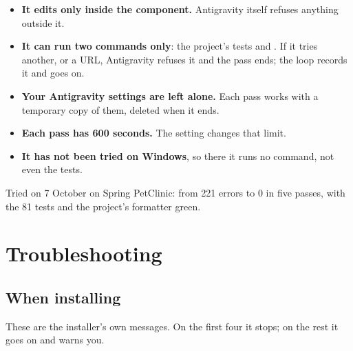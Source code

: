 \documentclass[11pt,a4paper]{article}
\begin{document}
\begin{itemize}
  \item \textbf{It edits only inside the component.} Antigravity itself refuses
        anything outside it.
  \item \textbf{It can run two commands only}: the project's tests and
        . If it tries another, or a URL, Antigravity refuses it and
        the pass ends; the loop records it and goes on.
  \item \textbf{Your Antigravity settings are left alone.} Each pass works with
        a temporary copy of them, deleted when it ends.
  \item \textbf{Each pass has 600 seconds.} The
         setting changes that limit.
  \item \textbf{It has not been tried on Windows}, so there it runs no command,
        not even the tests.
\end{itemize}

\begin{note}
Tried on 7 October on Spring PetClinic: from 221 errors to 0 in five passes,
with the 81 tests and the project's formatter green.
\end{note}

\section{Troubleshooting}
\label{sec:troubleshooting}

\newcommand\problem[2]{\par\addvspace{0.5\baselineskip}\noindent\textbf{\color{pbbrand}#1}\par\nopagebreak\vspace{-0.45\baselineskip}\noindent\hangindent=1.2em\hangafter=0 #2\par}

\subsection{When installing}

These are the installer's own messages. On the first four it stops; on the rest
it goes on and warns you.
\end{document}
